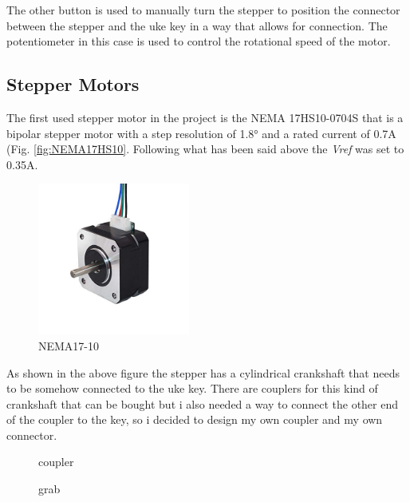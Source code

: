 \documentclass[a4paper,12pt]{article}
\begin{document}
\begin{multicols}{2}
The other button is used to manually turn the stepper to position the connector between the stepper and the uke key in a way that allows for connection. The potentiometer in this case is used to control the rotational speed of the motor.
\subsection{Stepper Motors}
The first used stepper motor in the project is the NEMA 17HS10-0704S that is a bipolar stepper motor with a step resolution of 1.8° and a rated current of 0.7A (Fig. \ref{fig:NEMA17HS10}. Following what has been said above the \textit{Vref} was set to 0.35A.
\begin{figure}[H]
    \begin{center}
        \includegraphics[width=5cm]{images/nema17-10.jpg}
        \caption{NEMA17-10}
        \label{fig:NEMA17-10}
    \end{center}
\end{figure}
As shown in the above figure the stepper has a cylindrical crankshaft that needs to be somehow connected to the uke key. There are couplers for this kind of crankshaft that can be bought but i also needed a way to connect the other end of the coupler to the key, so i decided to design my own coupler and my own connector.
\begin{figure}[H]
    \centering
    \caption{coupler}
    \label{fig:coupler}
\end{figure}
\begin{figure}[H]
    \centering
    \caption{grab}
    \label{fig:grab}
\end{figure}


\end{multicols}
\newpage
\end{document}
